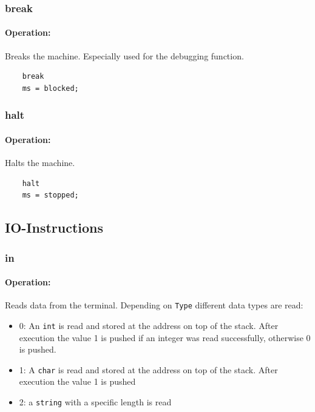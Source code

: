 \subsubsection{break}

\paragraph{Operation:}
Breaks the machine. Especially used for the debugging function.

	\begin{lstlisting}
	break
	ms = blocked;
	\end{lstlisting}

\subsubsection{halt}

\paragraph{Operation:}
Halts the machine.

	\begin{lstlisting}
	halt
	ms = stopped;
	\end{lstlisting}
	

\subsection{IO-Instructions}

\subsubsection{in}\label{sec:in}

\paragraph{Operation:}
Reads data from the terminal. Depending on \lstinline$Type$ different data types are read:

\begin{itemize}
	\item 0: An \lstinline$int$ is read and stored at the address on top of the stack. After execution the value 1 is pushed if an integer was read successfully, otherwise 0 is pushed.
	\item 1: A \lstinline$char$ is read and stored at the address on top of the stack. After execution the value 1 is pushed 
	\item 2: a \lstinline$string$ with a specific length is read
\end{itemize}

